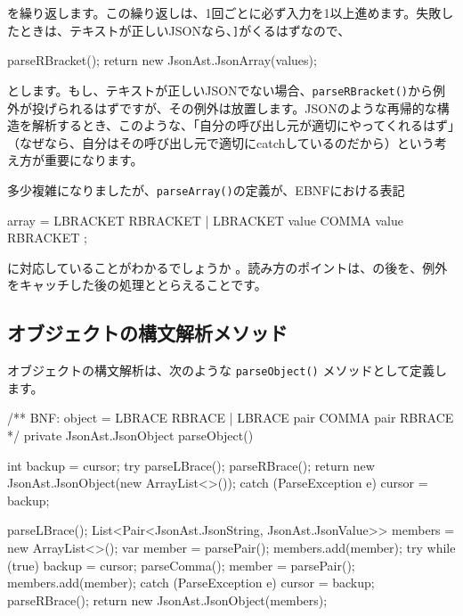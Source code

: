 \noindent を繰り返します。この繰り返しは、1回ごとに必ず入力を1以上進めます。失敗したときは、テキストが正しいJSONなら、\texttt{{]}}がくるはずなので、

\begin{codescreen}{}
parseRBracket();
return new JsonAst.JsonArray(values);
\end{codescreen}

\noindent とします。もし、テキストが正しいJSONでない場合、\texttt{parseRBracket()}から例外が投げられるはずですが、その例外は放置します。JSONのような再帰的な構造を解析するとき、このような、「自分の呼び出し元が適切にやってくれるはず」（なぜなら、自分はその呼び出し元で適切にcatchしているのだから）という考え方が重要になります。

多少複雑になりましたが、\texttt{parseArray()}の定義が、EBNFにおける表記

\begin{codescreen}{}
array = LBRACKET RBRACKET | LBRACKET value {COMMA value} RBRACKET ;
\end{codescreen}

\noindent に対応していることがわかるでしょうか
。読み方のポイントは、\texttt{\textbar{}}の後を、例外をキャッチした後の処理ととらえることです。

\subsection{オブジェクトの構文解析メソッド}

オブジェクトの構文解析は、次のような \texttt{parseObject()}
メソッドとして定義します。

\begin{codescreen}{}
    /** BNF: object = LBRACE RBRACE | LBRACE pair {COMMA pair} RBRACE */
    private JsonAst.JsonObject parseObject() {
        int backup = cursor;
        try {
            parseLBrace();
            parseRBrace();
            return new JsonAst.JsonObject(new ArrayList<>());
        } catch (ParseException e) {
            cursor = backup;
        }

        parseLBrace();
        List<Pair<JsonAst.JsonString, JsonAst.JsonValue>> members =
            new ArrayList<>();
        var member = parsePair();
        members.add(member);
        try {
            while (true) {
                backup = cursor;
                parseComma();
                member = parsePair();
                members.add(member);
            }
        } catch (ParseException e) {
            cursor = backup;
            parseRBrace();
            return new JsonAst.JsonObject(members);
        }
    }
\end{codescreen}

